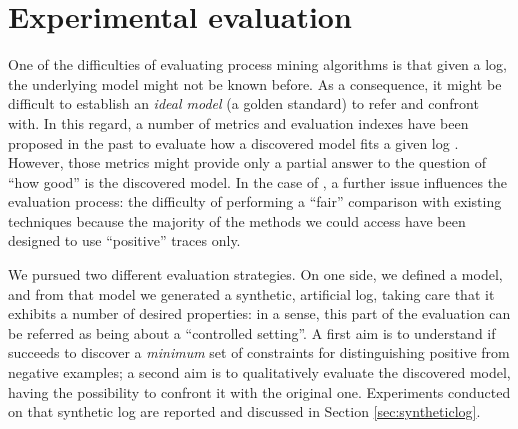 
\newcommand{\todoinfc}[1]{\todo[inline,backgroundcolor=yellow]{FC: #1}}



\section{Experimental evaluation}
\label{sec:eval}


One of the difficulties of evaluating process mining algorithms is that given a log, the underlying model might not be known before. As a consequence, it might be difficult to establish an \emph{ideal model} (a golden standard) to refer and confront with. In this regard, a number of metrics and evaluation indexes have been proposed in the past to evaluate how a discovered model fits a given log \cite{2015-Adriansyah,2014-Broucke,2018-Ponce}. However, those metrics might provide only a partial answer to the question of ``how good'' is the discovered model. 
%
In the case of \nd, a further issue influences the evaluation process: the difficulty of performing a ``fair'' comparison with existing techniques because the majority of the methods we could access have been designed to use ``positive'' traces only.



We pursued two different evaluation strategies. On one side, we defined a model, and from that model we generated a synthetic, artificial log, taking care that it exhibits a number of desired properties: in a sense, this part of the evaluation can be referred as being about a ``controlled setting''. A first aim is to understand if \nd succeeds to discover a \emph{minimum} set of constraints for distinguishing positive from negative examples; a second aim is to qualitatively evaluate the discovered model, having the possibility to confront it with the original one. Experiments conducted on that synthetic log are reported and discussed in Section \ref{sec:syntheticlog}.

